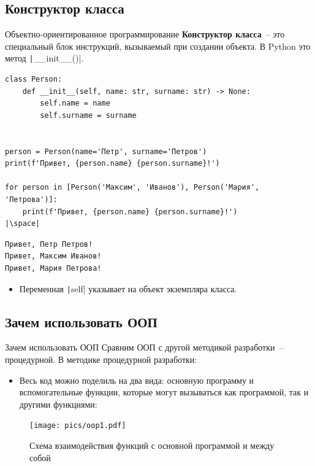 \documentclass[aspectratio=169, mathserif]{beamer}	%
\begin{document}
\subsection{Конструктор класса}
\begin{frame}[fragile]{Объектно-ориентированное программирование}
\scriptsize
\textcolor{tpugreen}{\textbf{Конструктор класса}}~-- это специальный блок инструкций, вызываемый при создании объекта. В Python это метод \texttt|__init__()|.
\vfill
\begin{verbatim}
class Person:
    def __init__(self, name: str, surname: str) -> None:
        self.name = name
        self.surname = surname


person = Person(name='Петр', surname='Петров')
print(f'Привет, {person.name} {person.surname}!')

for person in [Person('Максим', 'Иванов'), Person('Мария', 'Петрова')]:
    print(f'Привет, {person.name} {person.surname}!')
|\space|
\end{verbatim}
\begin{verbatim}
Привет, Петр Петров!
Привет, Максим Иванов!
Привет, Мария Петрова!
\end{verbatim}
\vfill
\begin{itemize}
\item Переменная \texttt|self| указывает на объект экземпляра класса.
\end{itemize}
\vfill
\end{frame}

\subsection{Зачем использовать ООП}
\begin{frame}[fragile]{Зачем использовать ООП}
\scriptsize
Сравним ООП с другой методикой разработки~-- процедурной.
В методике процедурной разработки:
\begin{itemize}
\item Весь код можно поделиль на два вида: основную программу и вспомогательные функции, которые могут вызываться как программой, так и другими функциями:
\end{itemize}
\begin{figure}[h!]
\centering
\texttt{[image: pics/oop1.pdf]}
\caption{Схема взаимодействия функций с основной программой и между собой}
\end{figure}
\vfill
\end{frame}
\end{document}
